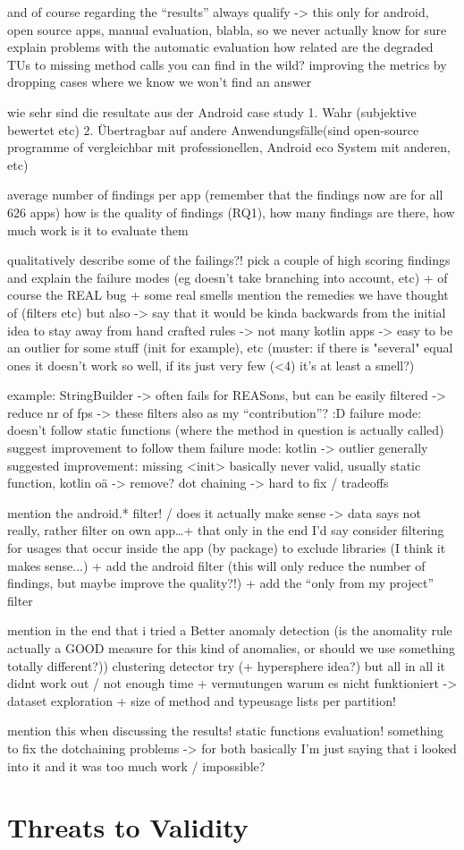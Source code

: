 and of course regarding the ``results'' always qualify -> this only for android, open source apps, manual evaluation, blabla, so we never actually know for sure
explain problems with the automatic evaluation
how related are the degraded TUs to missing method calls you can find in the wild?
improving the metrics by dropping cases where we know we won't find an answer

wie sehr sind die resultate aus der Android case study 1. Wahr (subjektive bewertet etc) 2. Übertragbar auf andere Anwendungsfälle(sind open-source programme of vergleichbar mit professionellen, Android eco System mit anderen, etc)

average number of findings per app (remember that the findings now are for all 626 apps)
how is the quality of findings (RQ1), how many findings are there, how much work is it to evaluate them

qualitatively describe some of the failings?! 
pick a couple of high scoring findings and explain the failure modes (eg doesn't take branching into account, etc)
+ of course the REAL bug + some real smells
mention the remedies we have thought of (filters etc) but also -> say that it would be kinda backwards from the initial idea to stay away from hand crafted rules
-> not many kotlin apps -> easy to be an outlier for some stuff (init for example), etc
(muster: if there is "several" equal ones it doesn't work so well, if its just very few (<4) it's at least a smell?)

example: StringBuilder -> often fails for REASons, but can be easily filtered -> reduce nr of fps
-> these filters also as my ``contribution''? :D 
failure mode: doesn't follow static functions (where the method in question is actually called)
    suggest improvement to follow them
failure mode: kotlin -> outlier generally
suggested improvement: missing <init> basically never valid, usually static function, kotlin oä -> remove?
dot chaining -> hard to fix / tradeoffs

mention the android.* filter! / does it actually make sense -> data says not really, rather filter on own app\ldots + that only in the end I'd say
consider filtering for usages that occur inside the app (by package) to exclude libraries (I think it makes sense...)
+ add the android filter (this will only reduce the number of findings, but maybe improve the quality?!)
+ add the ``only from my project'' filter

mention in the end that i tried a 
Better anomaly detection (is the anomality rule actually a GOOD measure for this kind of anomalies, or should we use something totally different?))
    clustering detector try (+ hypersphere idea?)
    but all in all it didnt work out / not enough time
    + vermutungen warum es nicht funktioniert -> dataset exploration + size of method and typeusage lists per partition!

mention this when discussing the results!
    static functions evaluation!
    something to fix the dotchaining problems
    -> for both basically I'm just saying that i looked into it and it was too much work / impossible?


\section{Threats to Validity}

